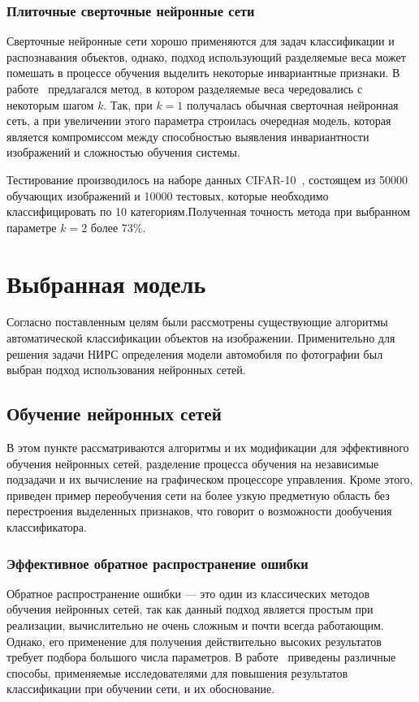 \documentclass[a4paper,14pt]{extarticle} %
\begin{document}
\subsubsection{Плиточные сверточные нейронные сети}
\hspace{\parindent} Сверточные нейронные сети хорошо применяются для задач классификации и распознавания объектов, однако, подход использующий разделяемые веса может помешать в процессе обучения выделить некоторые инвариантные признаки. В работе~\cite{ngiam2010tiled} предлагался метод, в котором разделяемые веса чередовались с некоторым шагом $k$. Так, при $k=1$ получалась обычная сверточная нейронная сеть, а при увеличении этого параметра строилась очередная модель, которая является компромиссом между способностью выявления инвариантности изображений и сложностью обучения системы.

Тестирование производилось на наборе данных CIFAR-10~\cite{krizhevsky2009learning}, состоящем из 50000 обучающих изображений и 10000 тестовых, которые необходимо классифицировать по 10 категориям.Полученная точность метода при выбранном параметре $k=2$ более 73\%.

\section{Выбранная модель}
\hspace{\parindent} Согласно поставленным целям были рассмотрены существующие алгоритмы автоматической классификации объектов на изображении. Применительно для решения задачи НИРС определения модели автомобиля по фотографии был выбран подход использования нейронных сетей.

\subsection{Обучение нейронных сетей}
\hspace{\parindent} В этом пункте рассматриваются алгоритмы и их модификации для эффективного обучения нейронных сетей, разделение процесса обучения на независимые подзадачи и их вычисление на графическом процессоре управления. Кроме этого, приведен пример переобучения сети на более узкую предметную область без перестроения выделенных признаков, что говорит о возможности дообучения классификатора.

\subsubsection{Эффективное обратное распространение ошибки} \label{backprop}
\hspace{\parindent} Обратное распространение ошибки --- это один из классических методов обучения нейронных сетей, так как данный подход является простым при реализации, вычислительно не очень сложным и почти всегда работающим. Однако, его применение для получения действительно высоких результатов требует подбора большого числа параметров. В работе~\cite{lecun2012efficient} приведены различные способы, применяемые исследователями для повышения результатов классификации при обучении сети, и их обоснование.
\end{document}
